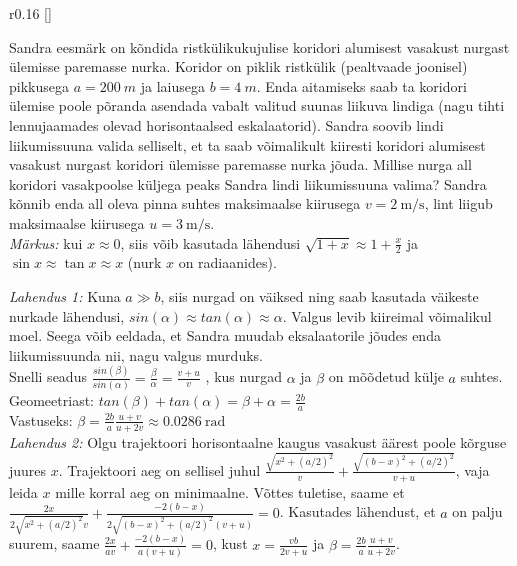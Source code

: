 
\begin{wrapfigure}{r}{0.16\textwidth}
\raisebox{-5pt}[\dimexpr{}\baselineskip\relax]{
}
\end{wrapfigure}

Sandra eesmärk on kõndida ristkülikukujulise koridori alumisest vasakust nurgast ülemisse paremasse nurka. Koridor on piklik ristkülik  (pealtvaade joonisel) pikkusega $a = \SI{200}{m}$ ja laiusega $b = \SI{4}{m}$. Enda aitamiseks saab ta koridori ülemise poole põranda asendada vabalt valitud suunas liikuva lindiga (nagu tihti lennujaamades olevad horisontaalsed eskalaatorid). Sandra soovib lindi liikumissuuna valida selliselt, et ta saab võimalikult kiiresti koridori alumisest vasakust nurgast koridori ülemisse paremasse nurka jõuda. Millise nurga all koridori vasakpoolse küljega peaks Sandra lindi liikumissuuna valima? Sandra kõnnib enda all oleva pinna suhtes maksimaalse kiirusega $v = \SI{2}{\meter \per \second}$, lint liigub maksimaalse kiirusega $u = \SI{3}{\meter \per \second}$.\\
\emph{Märkus:} kui $x \approx 0$, siis võib kasutada lähendusi $\sqrt{1+x} \approx 1 + \frac{x}{2}$ ja $\sin{x} \approx \tan{x} \approx x$ (nurk $x$ on radiaanides).






\hint

\solu
\emph{Lahendus 1:} Kuna $a \gg b$, siis nurgad on väiksed ning saab kasutada väikeste nurkade lähendusi, $ sin(\alpha) \approx tan( \alpha) \approx \alpha $. Valgus levib kiireimal võimalikul moel. Seega võib eeldada, et Sandra muudab eksalaatorile jõudes enda liikumissuunda nii, nagu valgus murduks.\\
Snelli seadus $ \frac{sin(\beta)}{sin(\alpha)} = \frac{\beta}{\alpha} = \frac{v+u}{v} $ , kus nurgad $\alpha$ ja $\beta$ on mõõdetud külje $a$  suhtes.\\
Geomeetriast: $ tan(\beta) + tan(\alpha) = \beta + \alpha =\frac{2b}{a}$\\
Vastuseks: $ \beta = \frac{2b}{a} \frac{u+v}{u+2v} \approx \SI{0,0286}{\radian}$\\


\emph{Lahendus 2:} Olgu trajektoori horisontaalne kaugus vasakust äärest poole kõrguse juures $x$. Trajektoori aeg on sellisel juhul $\frac{\sqrt{x^2+(a/2)^2}}{v} + \frac{\sqrt{(b-x)^2+(a/2)^2}}{v+u}$, vaja leida $x$ mille korral aeg on minimaalne. Võttes tuletise, saame et $\frac{2x}{2\sqrt{x^2+(a/2)^2}v} + \frac{-2(b-x)}{2\sqrt{(b-x)^2+(a/2)^2}(v+u)} = 0$. Kasutades lähendust, et $a$ on palju suurem, saame $\frac{2x}{av} + \frac{-2(b-x)}{a(v+u)} = 0$, kust $x = \frac{vb}{2v+u}$ ja $\beta = \frac{2b}{a} \frac{u+v}{u+2v}$.
\probend
